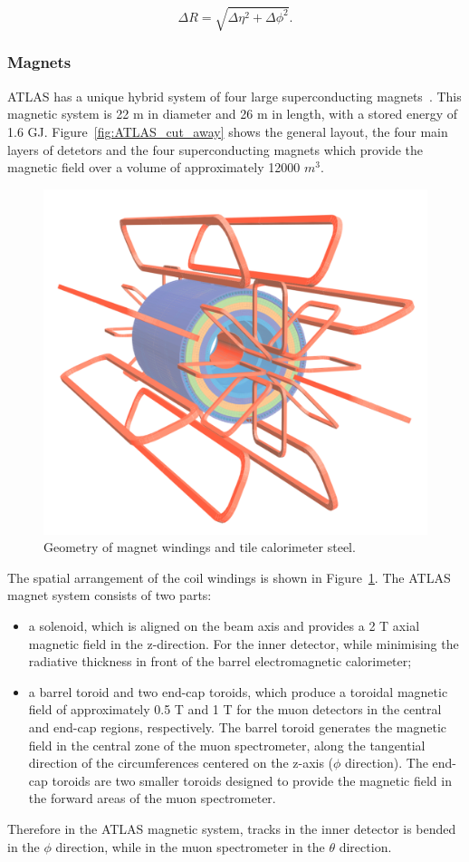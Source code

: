 \documentclass[letterpaper,12pt]{article}
\begin{document}
	\[\Delta R = \sqrt{\Delta \eta^2+\Delta\phi^2}.\]

\subsubsection{Magnets}


	ATLAS has a unique hybrid system of four large superconducting 
	magnets~\cite{ATLAS-TDR-06}. This magnetic system is 22 m in diameter and 26 m in length, 
	with a stored energy of 1.6 GJ.
	Figure~\ref{fig:ATLAS_cut_away} shows the general layout, 
	the four main layers of detetors and the four superconducting 
	magnets which provide the magnetic
	field over a volume of approximately 12000 $m^3$.
	
	\begin{figure}[bht]
		\begin{centering}	
		\includegraphics[width=.36\textwidth]{Detector_plots/ATLAS magnets.png}
		\caption{Geometry of magnet windings and
		tile calorimeter steel.	}
		\label{fig:ATLAS_magnets}
		\end{centering}
	\end{figure}

	The spatial arrangement of the coil windings is shown in 
	Figure~\ref{fig:ATLAS_magnets}. 
	The ATLAS magnet system consists of two parts:
	\begin{itemize}
		\item a solenoid, which is aligned on the beam axis and 
		provides a 2 T axial magnetic field in the z-direction. 
		For the inner detector, while minimising 
		the radiative thickness in front of the	barrel 
		electromagnetic calorimeter;
		\item  a barrel toroid and two end-cap toroids, 
		which produce a	toroidal magnetic field of approximately 
		0.5 T and 1 T for the muon detectors in the central 
		and end-cap regions, respectively. 
		The barrel toroid generates the magnetic field in the central zone 
		of the muon spectrometer, along the tangential direction of 
		the circumferences centered on the z-axis ($\phi$ direction). 
		The end-cap toroids are two smaller toroids designed to 
		provide the magnetic field in the forward areas of 
		the muon spectrometer. 
		
		
	\end{itemize}		
	Therefore in the ATLAS magnetic system, tracks in the inner detector
	is bended in the $\phi$ direction, while in the muon spectrometer 
	in the $\theta$ direction.
\end{document}
